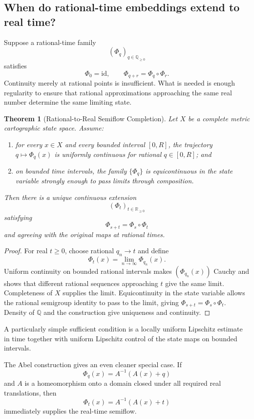 \documentclass[11pt]{article}
\newtheorem{theorem}{Theorem}[section]
\newcommand{\Rge}{\mathbb{R}_{\ge 0}}
\newcommand{\Qge}{\mathbb{Q}_{\ge 0}}
\begin{document}
\subsection{When do rational-time embeddings extend to real time?}
Suppose a rational-time family
\[
(\Phi_q)_{q\in\Qge}
\]
satisfies
\[
\Phi_0=\mathrm{id},\qquad \Phi_{q+r}=\Phi_q\circ\Phi_r.
\]
Continuity merely at rational points is insufficient. What is needed is enough regularity to ensure that rational approximations approaching the same real number determine the same limiting state.

\begin{theorem}[Rational-to-Real Semiflow Completion]
Let $X$ be a complete metric cartographic state space. Assume:
\begin{enumerate}[label=(\arabic*)]
\item for every $x\in X$ and every bounded interval $[0,R]$, the trajectory $q\mapsto\Phi_q(x)$ is uniformly continuous for rational $q\in[0,R]$; and
\item on bounded time intervals, the family $\{\Phi_q\}$ is equicontinuous in the state variable strongly enough to pass limits through composition.
\end{enumerate}
Then there is a unique continuous extension
\[
(\Phi_t)_{t\in\Rge}
\]
satisfying
\[
\Phi_{s+t}=\Phi_s\circ\Phi_t
\]
and agreeing with the original maps at rational times.
\end{theorem}

\begin{proof}
For real $t\ge0$, choose rational $q_n\to t$ and define
\[
\Phi_t(x)=\lim_{n\to\infty}\Phi_{q_n}(x).
\]
Uniform continuity on bounded rational intervals makes $(\Phi_{q_n}(x))$ Cauchy and shows that different rational sequences approaching $t$ give the same limit. Completeness of $X$ supplies the limit. Equicontinuity in the state variable allows the rational semigroup identity to pass to the limit, giving $\Phi_{s+t}=\Phi_s\circ\Phi_t$. Density of $\mathbb Q$ and the construction give uniqueness and continuity.
\end{proof}

A particularly simple sufficient condition is a locally uniform Lipschitz estimate in time together with uniform Lipschitz control of the state maps on bounded intervals.

The Abel construction gives an even cleaner special case. If
\[
\Phi_q(x)=A^{-1}(A(x)+q)
\]
and $A$ is a homeomorphism onto a domain closed under all required real translations, then
\[
\Phi_t(x)=A^{-1}(A(x)+t)
\]
immediately supplies the real-time semiflow.
\end{document}
